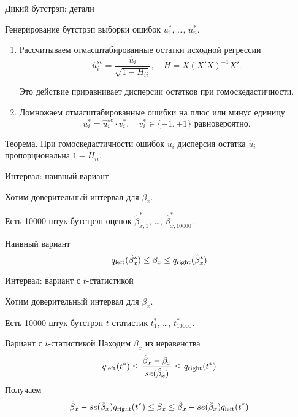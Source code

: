   

\begin{frame}{Дикий бутстрэп: детали}

Генерирование бутстрэп выборки ошибок $u^*_1$, \ldots, $u^*_n$.

  \begin{enumerate}[<+->]
    \item Рассчитываем отмасштабированные остатки исходной регрессии
    \[
    \hat u_i^{sc} = \frac{\hat u_i}{\sqrt{1 - H_{ii}}}, \quad H = X(X'X)^{-1}X'.
    \]
    
  
    Это действие \alert{приравнивает} дисперсии остатков при гомоскедастичности. 
    \item Домножаем отмасштабированные ошибки на плюс или минус единицу
  \[
    u^*_i  = \hat u_i^{sc} \cdot v_i^*, \quad  v_i^* \in \{-1, +1\} \text{ равновероятно}.
  \]
\end{enumerate}
\pause
\alert{Теорема.} При гомоскедастичности ошибок $u_i$ дисперсия остатка $\hat u_i$ пропорциональна $1 - H_{ii}$.

\end{frame}




  
  \begin{frame}{Интервал: наивный вариант}
  
  
  Хотим доверительный интервал для $\beta_x$.
  
  Есть 10000 штук бутстрэп оценок $\hat \beta^*_{x,1}$, \ldots, $\hat \beta^*_{x, 10000}$.
  
  \pause
  \begin{block}{Наивный вариант}
  \[
  q_{\text{left}}(\hat \beta_x^*) \leq \beta_x \leq q_{\text{right}}(\hat \beta_x^*)
  \]
  \end{block}
  
  
  \end{frame}
  
  
  \begin{frame}{Интервал: вариант с $t$-статистикой}
  
  Хотим доверительный интервал для $\beta_x$.
  
  Есть 10000 штук бутстрэп $t$-статистик
  $t^*_{1}$, \ldots, $t^*_{10000}$.
  
  
  \pause
  \begin{block}{Вариант с $t$-статистикой}
  Находим $\beta_x$ из неравенства
  \[
  q_{\text{left}}(t^*) \leq \frac{\hat \beta_x - \beta_x}{se(\hat \beta_x)} \leq q_{\text{right}}(t^*)    
  \]
  Получаем 
  \[
  \hat \beta_x  - se(\hat \beta_x) q_{\text{right}}(t^*) \leq \beta_x \leq \hat \beta_x - se(\hat \beta_x) q_{\text{left}}(t^*)      
  \]
  \end{block}
  
  
  \end{frame}
  
    